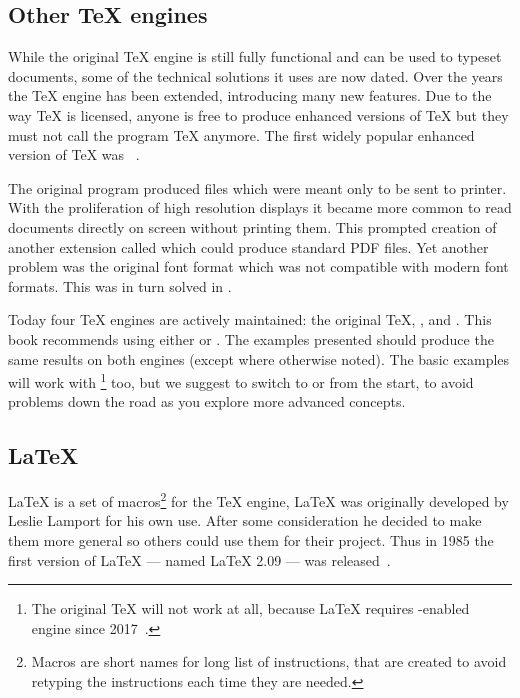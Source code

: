 \subsection{Other \TeX{} engines}

While the original \TeX{} engine is still fully functional and can be used to
typeset documents, some of the technical solutions it uses are now dated. Over
the years the \TeX{} engine has been extended, introducing many new features.
Due to the way \TeX{} is licensed, anyone is free to produce enhanced versions
of \TeX{} but they must not call the program \TeX{} anymore. The first widely
popular enhanced version of \TeX{} was ~\cite{etex}.

The original program produced  files which were meant only to be sent
to printer. With the proliferation of high resolution displays it became more
common to read documents directly on screen without printing them. This
prompted creation of another extension called  which could
produce standard PDF files. Yet another problem was the original font format
which was not compatible with modern font formats. This was in turn solved in
.

Today four \TeX{} engines are actively maintained: the original \TeX{},
,  and . This book recommends using
either  or . The examples presented should produce
the same results on both engines (except where otherwise noted). The basic
examples will work with \footnote{The original \TeX{} will not
  work at all, because \LaTeX{} requires -enabled engine since
  2017~\cite{etex-kernel}.} too, but we suggest to switch to  or
 from the start, to avoid problems down the road as you explore
more advanced concepts.

\subsection{\LaTeX{}}

\LaTeX{} is a set of macros\footnote{Macros are short names for long list of
  instructions, that are created to avoid retyping the instructions each time
  they are needed.} for the \TeX{} engine, \LaTeX{} was originally developed by
Leslie Lamport for his own use. After some
consideration he decided to make them more general so others could use them
for their project. Thus in 1985 the first version of \LaTeX{} --- named
\LaTeX{} 2.09 --- was released~\cite{manual}.

